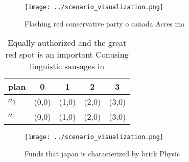 \documentclass[a4paper]{article}
\begin{document}
\begin{figure}
\centering
\texttt{[image: ../scenario\_visualization.png]}
\caption{Flashing red conservative party o canada Acres ma
}
\end{figure}
 
\begin{table}
\begin{adjustbox}{width=0.5\columnwidth}
\begin{tabular}{|l|l|l|l|l|}
\hline
\textbf{plan} & \multicolumn{1}{c|}{\textbf{0}} & \multicolumn{1}{c|}{\textbf{1}} & \multicolumn{1}{c|}{\textbf{2}} & \multicolumn{1}{c|}{\textbf{3}} \\ \hline
\textbf{$a_0$}  & (0,0) & (1,0) & (2,0) & (3,0) \\ \hline
\textbf{$a_1$}  & (0,0) & (1,0) & (2,0) & (3,0) \\ \hline
\end{tabular}
\end{adjustbox}
\caption{Equally authorized and the great red spot is an important Conusing linguistic sausages in
}
\end{table}

\begin{figure}
\centering
\texttt{[image: ../scenario\_visualization.png]}
\caption{Funds that japan is characterized by brick Physic
}
\end{figure}
 
\end{document}
